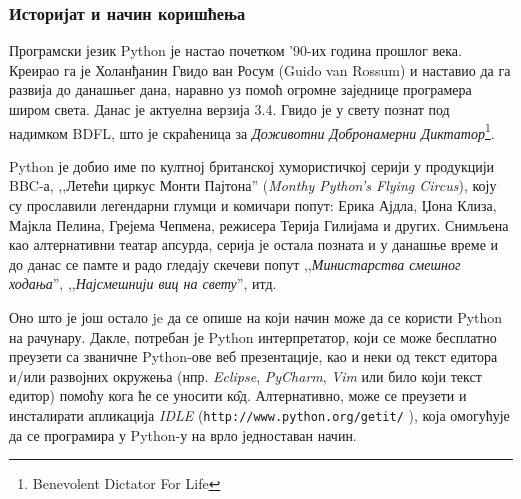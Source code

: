 \subsubsection{Историјат и начин коришћења}
Програмски језик Python је настао почетком '90-их година прошлог века. Креирао га је Холанђанин Гвидо ван Росум (Guido van Rossum) и наставио да га развија до данашњег дана, наравно уз помоћ огромне заједнице програмера широм света. Данас је актуелна верзија 3.4. Гвидо је у свету познат под надимком BDFL, што је скраћеница за \emph{Доживотни Добронамерни Диктатор}\footnote{Benevolent Dictator For Life}.

Python је добио име по култној британској хумористичкој серији у продукцији BBC-а, ,,Летећи циркус Монти Пајтона'' (\emph{Monthy Python's Flying Circus}), коју су прославили легендарни глумци и комичари попут: Ерика Ајдла, Џона Клиза, Мајкла Пелина, Грејема Чепмена, режисера Терија Гилијама и других. Снимљена као алтернативни театар апсурда, серија је остала позната и у данашње време и до данас се памте и радо гледају скечеви попут ,,\emph{Министарства смешног ходања}'', ,,\emph{Најсмешнији виц на свету}'', итд.

Оно што је још остало je да се опише на који начин може да се користи Python на рачунару. Дакле, потребан је Python интерпретатор, који се може бесплатно преузети са званичне Python-ове веб презентације\cite{pythonsite}, као и неки од текст едитора и/или развојних окружења (нпр. \emph{Eclipse}, \emph{PyCharm}, \emph{Vim} или било који текст едитор) помоћу кога ће се уносити к\^{о}д. Алтернативно, може се преузети и инсталирати апликација \emph{IDLE} (\texttt{http://www.python.org/getit/} ), која омогућује да се програмира у Python-у на врло једноставан начин.
